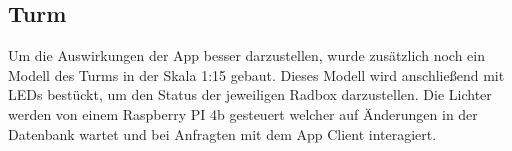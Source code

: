 \subsection{Turm}

Um die Auswirkungen der App besser darzustellen, wurde zusätzlich noch ein Modell des Turms in der Skala 1:15 gebaut. Dieses Modell wird anschließend mit LEDs bestückt, um den Status der jeweiligen Radbox darzustellen. Die Lichter werden von einem Raspberry PI 4b gesteuert welcher auf Änderungen in der Datenbank wartet und bei Anfragten mit dem App Client interagiert.






